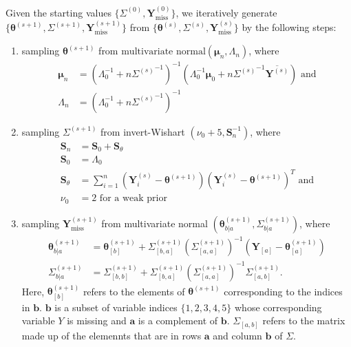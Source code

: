 \documentclass[12pt]{article}
\begin{document}
Given the starting values $\{\Sigma^{(0)}, \mathbf{Y}_\text{miss}^{(0)}\}$, we iteratively generate $\{\boldsymbol{\theta}^{(s+1)}, \Sigma^{(s+1)}, \mathbf{Y}_{\text{miss}}^{(s+1)}\}$ from $\{\boldsymbol{\theta}^{(s)}, \Sigma^{(s)}, \mathbf{Y}_{\text{miss}}^{(s)}\}$ by the following steps:

\begin{enumerate}
\item sampling $\boldsymbol{\theta}^{(s+1)}$ from $\text{multivariate normal}(\boldsymbol{\mu}_n, \Lambda_n)$, where 
\begin{align*}
\boldsymbol{\mu}_n &= (\Lambda_0^{-1}+n{\Sigma^{(s)}}^{-1})^{-1}(\Lambda_0^{-1}\boldsymbol{\mu}_0+n{\Sigma^{(s)}}^{-1}\overline{\boldsymbol{Y}^{(s)}}) \text{ and}\\
\Lambda_n &= (\Lambda_0^{-1}+n{\Sigma^{(s)}}^{-1})^{-1}
\end{align*}
\item sampling $\Sigma^{(s+1)}$ from invert-Wishart $(\nu_0+5, \mathbf{S}_n^{-1})$, where 
\begin{align*}
\mathbf{S}_n &=  \mathbf{S}_0+\mathbf{S}_\theta\\
\mathbf{S}_0 &= \Lambda_0\\
\mathbf{S}_\theta &= \sum_{i=1}^{n} (\mathbf{Y}_i^{(s)}-\boldsymbol{\theta}^{(s+1)})(\mathbf{Y}^{(s)}_i-\boldsymbol{\theta}^{(s+1)})^T\text{ and}\\
\nu_0 &= 2\text{ for a weak prior}
\end{align*}
\item sampling $\mathbf{Y}_{\text{miss}}^{(s+1)}$ from multivariate normal $(\boldsymbol{\theta}^{(s+1)}_{b|a}, \Sigma^{(s+1)}_{b|a})$, where
\begin{align*}
\boldsymbol{\theta}^{(s+1)}_{b|a} &= \boldsymbol{\theta}^{(s+1)}_{[b]} + \Sigma^{(s+1)}_{[b,a]}(\Sigma^{(s+1)}_{[a,a]})^{-1}(\mathbf{Y}_{[a]} - \boldsymbol{\theta}^{(s+1)}_{[a]})\\
\Sigma^{(s+1)}_{b|a} &= {\Sigma}^{(s+1)}_{[b,b]} + \Sigma^{(s+1)}_{[b,a]}(\Sigma^{(s+1)}_{[a,a]})^{-1}\Sigma^{(s+1)}_{[a,b]}.
\end{align*}
Here, $\boldsymbol{\theta}^{(s+1)}_{[b]}$ refers to the elements of $\boldsymbol{\theta}^{(s+1)}$ corresponding to the indices in $\mathbf{b}$. $\mathbf{b}$ is a subset of variable indices $\{1,2,3,4,5\}$ whose corresponding variable $Y$ is missing and  $\mathbf{a}$ is a complement of $\mathbf{b}$. $\Sigma_{[a,b]}$ refers to the matrix made up of the elemennts that are in rows $\mathbf{a}$ and column $\mathbf{b}$ of $\Sigma$.

\end{enumerate}
\end{document}
